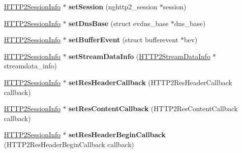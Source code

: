 \begin{DoxyCompactItemize}
\item 
\mbox{\label{classhttp2_1_1HTTP2SessionInfo_a65a67fe740500731dd3ab3155ad55ab8}} 
\hyperlink{classhttp2_1_1HTTP2SessionInfo}{H\+T\+T\+P2\+Session\+Info} $\ast$ {\bfseries set\+Session} (nghttp2\+\_\+session $\ast$session)
\item 
\mbox{\label{classhttp2_1_1HTTP2SessionInfo_a471c2c85f4c0579a37478732ca9b0c97}} 
\hyperlink{classhttp2_1_1HTTP2SessionInfo}{H\+T\+T\+P2\+Session\+Info} $\ast$ {\bfseries set\+Dns\+Base} (struct evdns\+\_\+base $\ast$dns\+\_\+base)
\item 
\mbox{\label{classhttp2_1_1HTTP2SessionInfo_a6e62b14962c73424f55538a3e67c453f}} 
\hyperlink{classhttp2_1_1HTTP2SessionInfo}{H\+T\+T\+P2\+Session\+Info} $\ast$ {\bfseries set\+Buffer\+Event} (struct bufferevent $\ast$bev)
\item 
\mbox{\label{classhttp2_1_1HTTP2SessionInfo_a67462989dad5eb339b19895d4918cc67}} 
\hyperlink{classhttp2_1_1HTTP2SessionInfo}{H\+T\+T\+P2\+Session\+Info} $\ast$ {\bfseries set\+Stream\+Data\+Info} (\hyperlink{classhttp2_1_1HTTP2StreamDataInfo}{H\+T\+T\+P2\+Stream\+Data\+Info} $\ast$streamdata\+\_\+info)
\item 
\mbox{\label{classhttp2_1_1HTTP2SessionInfo_a45318e50b198157e0107b2d3e5a82a15}} 
\hyperlink{classhttp2_1_1HTTP2SessionInfo}{H\+T\+T\+P2\+Session\+Info} $\ast$ {\bfseries set\+Res\+Header\+Callback} (H\+T\+T\+P2\+Res\+Header\+Callback callback)
\item 
\mbox{\label{classhttp2_1_1HTTP2SessionInfo_a609a92ed5ec3a2bf2c221c146a9f6602}} 
\hyperlink{classhttp2_1_1HTTP2SessionInfo}{H\+T\+T\+P2\+Session\+Info} $\ast$ {\bfseries set\+Res\+Content\+Callback} (H\+T\+T\+P2\+Res\+Content\+Callback callback)
\item 
\mbox{\label{classhttp2_1_1HTTP2SessionInfo_a39fa18cf6546385a2fd1f08091ff5a42}} 
\hyperlink{classhttp2_1_1HTTP2SessionInfo}{H\+T\+T\+P2\+Session\+Info} $\ast$ {\bfseries set\+Res\+Header\+Begin\+Callback} (H\+T\+T\+P2\+Res\+Header\+Begin\+Callback callback)

\end{DoxyCompactItemize}
